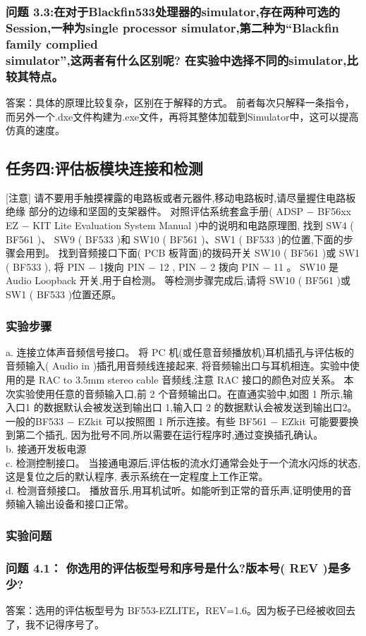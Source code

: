 \documentclass{article}
\begin{document}
\begin{CJK}{UTF8}{gbsn}
\subsubsection*{问题 3.3:在对于Blackfin533处理器的simulator,存在两种可选的Session,一种为single
processor simulator,第二种为“Blackfin family complied \\simulator”,这两者有什么区别呢?
在实验中选择不同的simulator,比较其特点。} 
答案：具体的原理比较复杂，区别在于解释的方式。
前者每次只解释一条指令，而另外一个.dxe文件构建为.exe文件，再将其整体加载到Simulator中，这可以提高仿真的速度。
\subsection{任务四:评估板模块连接和检测}
[注意] 请不要用手触摸裸露的电路板或者元器件,移动电路板时,请尽量握住电路板绝缘
部分的边缘和坚固的支架器件。
对照评估系统套盒手册( ADSP − BF56xx EZ − KIT Lite Evaluation System Manual )中的说明和电路原理图,
找到 SW4 ( BF561 )、 SW9 ( BF533 )和 SW10 ( BF561 )、SW1 ( BF533 )的位置,下面的步骤会用到。
找到音频接口下面( PCB 板背面)的拨码开关 SW10 ( BF561 )或 SW1 ( BF533 ),
将 PIN − 1拨向 PIN − 12 , PIN − 2 拨向 PIN − 11 。 SW10 是 Audio Loopback 开关,用于自检测。
等检测步骤完成后,请将 SW10 ( BF561 )或 SW1 ( BF533 )位置还原。
\subsubsection{实验步骤}
a. 连接立体声音频信号接口。
将 PC 机(或任意音频播放机)耳机插孔与评估板的音频输入( Audio in )插孔用音频线连接起来,
将音频输出口与耳机相连。实验中使用的是 RAC to 3.5mm stereo cable 音频线,注意 RAC 接口的颜色对应关系。
本次实验使用任意的音频输入口,前 2 个音频输出口。在直通实验中,如图 1 所示,输入口1 的数据默认会被发送到输出口 1,输入口 2 的数据默认会被发送到输出口2。
一般的BF533 − EZkit 可以按照图 1 所示连接。有些 BF561 − EZkit 可能要要换到第二个插孔,
因为批号不同,所以需要在运行程序时,通过变换插孔确认。\\
b. 接通开发板电源\\
c. 检测控制接口。
当接通电源后,评估板的流水灯通常会处于一个流水闪烁的状态,这是复位之后的默认程序,
表示系统在一定程度上工作正常。\\
d. 检测音频接口。
播放音乐,用耳机试听。如能听到正常的音乐声,证明使用的音频输入输出设备和接口正常。
\subsubsection{实验问题}
\subsubsection*{问题 4.1： 你选用的评估板型号和序号是什么?版本号( REV )是多少?}
答案：选用的评估板型号为 BF553-EZLITE，REV=1.6。因为板子已经被收回去了，我不记得序号了。

\end{CJK}
\end{document}
